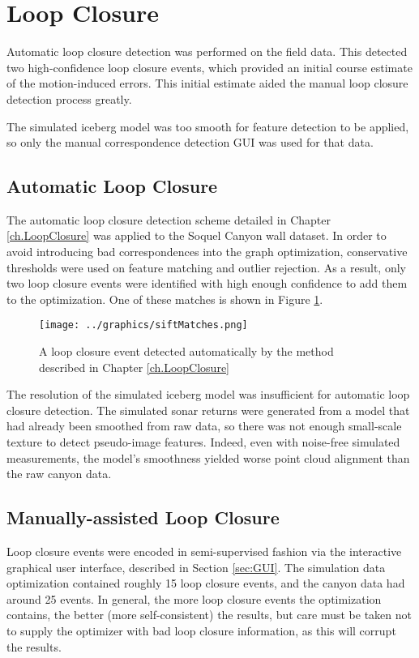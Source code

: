 \section{Loop Closure}

Automatic loop closure detection was performed on the field data. This detected two high-confidence loop closure events, which provided an initial course estimate of the motion-induced errors. This initial estimate aided the manual loop closure detection process greatly.

The simulated iceberg model was too smooth for feature detection to be applied, so only the manual correspondence detection GUI was used for that data. 
\subsection{Automatic Loop Closure}

The automatic loop closure detection scheme detailed in Chapter \ref{ch.LoopClosure} was applied to the Soquel Canyon wall dataset. In order to avoid introducing bad correspondences into the graph optimization, conservative thresholds were used on feature matching and outlier rejection. As a result, only two loop closure events were identified with high enough confidence to add them to the optimization. One of these matches is shown in Figure \ref{fig:autoLC}.

 \begin{figure}[!htb]
   \centering
   \texttt{[image: ../graphics/siftMatches.png]} %
   \caption{A loop closure event detected automatically by the method described in Chapter \ref{ch.LoopClosure}}
   \label{fig:autoLC}
\end{figure}

The resolution of the simulated iceberg model was insufficient for automatic loop closure detection. The simulated sonar returns were generated from a model that had already been smoothed from raw data, so there was not enough small-scale texture to detect pseudo-image features. Indeed, even with noise-free simulated measurements, the model's smoothness yielded worse point cloud alignment than the raw canyon data.

\subsection{Manually-assisted Loop Closure}

Loop closure events were encoded in semi-supervised fashion via the interactive graphical user interface, described in Section \ref{sec:GUI}. The simulation data optimization contained roughly 15 loop closure events, and the canyon data had around 25 events. In general, the more loop closure events the optimization contains, the better (more self-consistent) the results, but care must be taken not to supply the optimizer with bad loop closure information, as this will corrupt the results.

